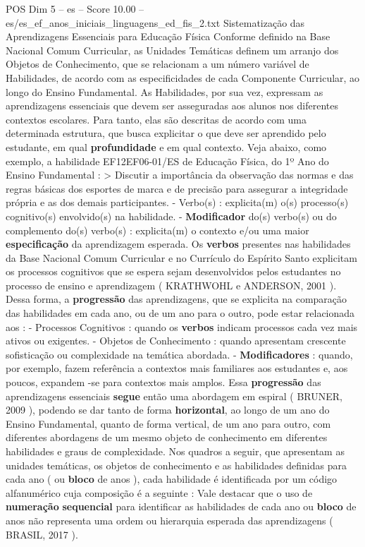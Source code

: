 \begin{textsample}{POS Dim 5 – es – Score 10.00 – es/es\_ef\_anos\_iniciais\_linguagens\_ed\_fis\_2.txt}  \label{ex:f5_pos_104}
Sistematização das Aprendizagens Essenciais para Educação Física Conforme definido na Base Nacional Comum Curricular, as Unidades Temáticas definem um arranjo dos Objetos de Conhecimento, que se relacionam a um número variável de Habilidades, de acordo com as especificidades de cada Componente Curricular, ao longo do Ensino Fundamental.
As Habilidades, por sua vez, expressam as aprendizagens essenciais que devem ser asseguradas aos alunos nos diferentes contextos escolares.
Para tanto, elas são descritas de acordo com uma determinada estrutura, que busca explicitar o que deve ser aprendido pelo estudante, em qual \textbf{profundidade} e em qual contexto.
Veja abaixo, como exemplo, a habilidade EF12EF06-01/ES de Educação Física, do 1º Ano do Ensino Fundamental : > Discutir a importância da observação das normas e das regras básicas dos esportes de marca e de precisão para assegurar a integridade própria e as dos demais participantes. - Verbo(s) : explicita(m) o(s) processo(s) cognitivo(s) envolvido(s) na habilidade. - \textbf{Modificador} do(s) verbo(s) ou do complemento do(s) verbo(s) : explicita(m) o contexto e/ou uma maior \textbf{especificação} da aprendizagem esperada.
Os \textbf{verbos} presentes nas habilidades da Base Nacional Comum Curricular e no Currículo do Espírito Santo explicitam os processos cognitivos que se espera sejam desenvolvidos pelos estudantes no processo de ensino e aprendizagem ( KRATHWOHL e ANDERSON, 2001 ).
Dessa forma, a \textbf{progressão} das aprendizagens, que se explicita na comparação das habilidades em cada ano, ou de um ano para o outro, pode estar relacionada aos : - Processos Cognitivos : quando os \textbf{verbos} indicam processos cada vez mais ativos ou exigentes. - Objetos de Conhecimento : quando apresentam crescente sofisticação ou complexidade na temática abordada. - \textbf{Modificadores} : quando, por exemplo, fazem referência a contextos mais familiares aos estudantes e, aos poucos, expandem -se para contextos mais amplos.
Essa \textbf{progressão} das aprendizagens essenciais \textbf{segue} então uma abordagem em espiral ( BRUNER, 2009 ), podendo se dar tanto de forma \textbf{horizontal}, ao longo de um ano do Ensino Fundamental, quanto de forma vertical, de um ano para outro, com diferentes abordagens de um mesmo objeto de conhecimento em diferentes habilidades e graus de complexidade.
Nos quadros a seguir, que apresentam as unidades temáticas, os objetos de conhecimento e as habilidades definidas para cada ano ( ou \textbf{bloco} de anos ), cada habilidade é identificada por um código alfanumérico cuja composição é a seguinte : Vale destacar que o uso de \textbf{numeração} \textbf{sequencial} para identificar as habilidades de cada ano ou \textbf{bloco} de anos não representa uma ordem ou hierarquia esperada das aprendizagens ( BRASIL, 2017 ).

\end{textsample}
